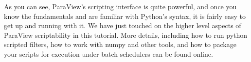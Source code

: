 As you can see, ParaView's scripting interface is quite powerful, and once you know the fundamentals and are familiar with Python's syntax, it is fairly easy to get up and running with it. We have just touched on the higher level aspects of ParaView scriptability in this tutorial. More details, including how to run python scripted filters, how to work with numpy and other tools, and how to package your scripts for execution under batch schedulers can be found online.


